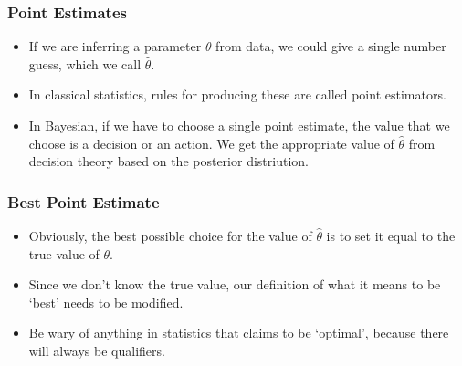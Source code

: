 \documentclass{beamer}
\begin{document}
\begin{frame}
\frametitle{Point Estimates}

\begin{itemize}
\item If we are inferring a parameter $\theta$ from data, we could
give a single number guess, which we call $\hat{\theta}$. \pause
\item In classical statistics, rules for producing these are called point
estimators. \pause
\item  In Bayesian, if we have to choose a single point estimate,
the value that we choose is a decision or an action. We
get the appropriate value of $\hat{\theta}$
from decision theory based on the posterior
distriution.
\end{itemize}

\end{frame}

\begin{frame}
\frametitle{Best Point Estimate}
\begin{itemize}
\item Obviously, the best possible choice for the value of $\hat{\theta}$ is to
set it equal to the true value of $\theta$.\pause
\item Since we don't know the true value, our definition of what it means to
be `best' needs to be modified.\pause
\item Be wary of anything in statistics that claims to be `optimal', because
there will always be qualifiers.
\end{itemize}
\end{frame}
\end{document}
